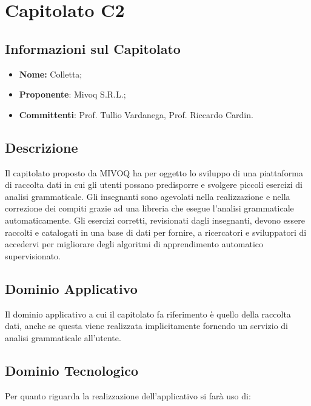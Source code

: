 \section{Capitolato C2}
\subsection{Informazioni sul Capitolato}
\begin{itemize}
	\item \textbf{Nome:} Colletta;
	\item \textbf{Proponente}: Mivoq S.R.L.;
	\item \textbf{Committenti}: Prof. Tullio Vardanega, Prof. Riccardo Cardin.
\end{itemize}

\subsection{Descrizione}
Il capitolato proposto da MIVOQ ha per oggetto lo sviluppo di una piattaforma 
di raccolta dati in cui gli utenti possano predisporre e svolgere piccoli esercizi di analisi grammaticale. Gli insegnanti sono agevolati nella realizzazione e nella correzione dei compiti grazie ad una libreria che esegue l’analisi grammaticale automaticamente.
Gli esercizi corretti, revisionati dagli insegnanti, devono essere raccolti e catalogati in una base di dati per fornire, a ricercatori e sviluppatori di accedervi per migliorare degli algoritmi di apprendimento automatico supervisionato. 

\subsection{Dominio Applicativo}
Il dominio applicativo a cui il capitolato fa riferimento è quello della raccolta dati, anche se questa viene realizzata implicitamente fornendo un servizio 
di analisi grammaticale all’utente. 

\subsection{Dominio Tecnologico}
Per quanto riguarda la realizzazione dell’applicativo si farà uso di:

